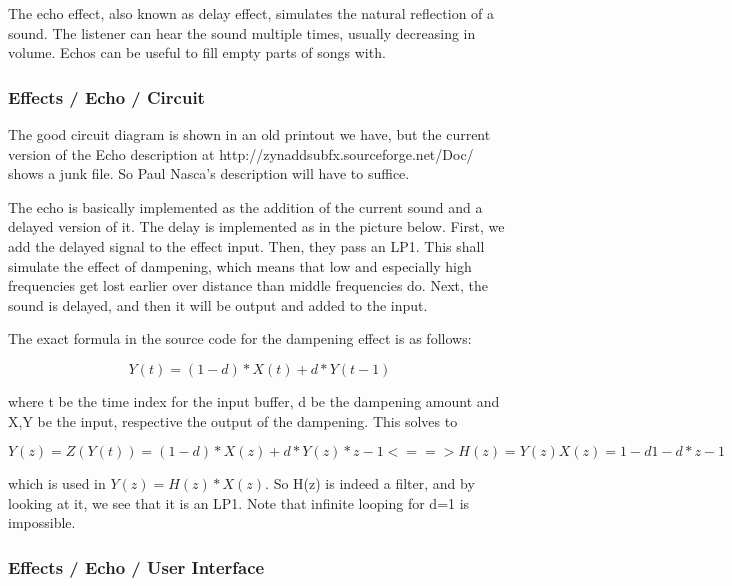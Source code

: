    The echo effect, also known as delay effect, simulates the natural
   reflection of a sound. The listener can hear the sound multiple times,
   usually decreasing in volume. Echos can be useful to fill empty parts of
   songs with.

\subsubsection{Effects / Echo / Circuit}
\label{subsubsec:effects_edit_echo_circuit}

   The good circuit diagram is shown in an old printout we have, but the
   current version of the Echo description at
   http://zynaddsubfx.sourceforge.net/Doc/ shows a
   junk file.  So Paul Nasca's description will have to suffice.


   The echo is basically implemented as the addition of the
   current sound and a delayed version of it. The delay is implemented as in
   the picture below. First, we add the delayed signal to the effect input.
   Then, they pass an LP1. This shall simulate the effect of dampening, which
   means that low and especially high frequencies get lost earlier over
   distance than middle frequencies do. Next, the sound is delayed, and then
   it will be output and added to the input.

   The exact formula in the source code for the dampening effect is as
   follows:

   \[Y(t)=(1-d)*X(t)+d*Y(t-1)\]

   where t be the time index for the input buffer, d be the dampening amount
   and X,Y be the input, respective the output of the dampening. This solves
   to

   \[Y(z)=Z(Y(t))=(1-d)*X(z)+d*Y(z)*z-1 <==> H(z)=Y(z)X(z)=1-d1-d*z-1\]

   which is used in \(Y(z)=H(z)*X(z)\). So H(z) is indeed a filter, and by
   looking at it, we see that it is an LP1. Note that infinite looping for
   d=1 is impossible.

\subsubsection{Effects / Echo / User Interface}
\label{subsubsec:effects_edit_echo_ui}

